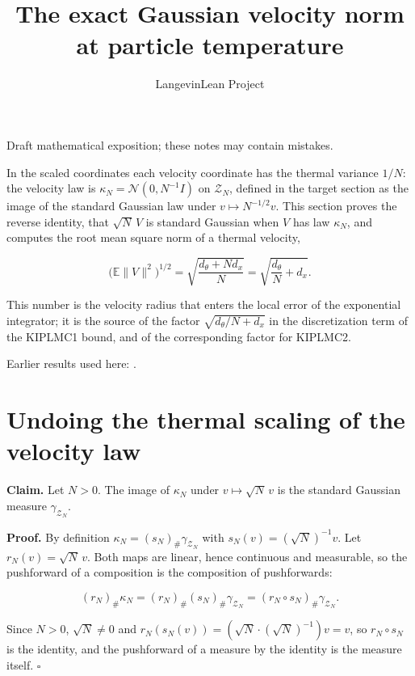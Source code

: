 \documentclass[11pt,a4paper]{article}
\title{\texorpdfstring{The exact Gaussian velocity norm at particle temperature}{The exact Gaussian velocity norm at particle temperature}}
\author{LangevinLean Project}
\date{}
\begin{document}
\maketitle
Draft mathematical exposition; these notes may contain mistakes.


In the scaled coordinates each velocity coordinate has the thermal variance \(1/N\): the velocity law is \(\kappa_N=\mathcal N(0,N^{-1}I)\) on \(\mathcal Z_N\), defined in the target section as the image of the standard Gaussian law under \(v\mapsto N^{-1/2}v\). This section proves the reverse identity, that \(\sqrt N\,V\) is standard Gaussian when \(V\) has law \(\kappa_N\), and computes the root mean square norm of a thermal velocity,


\[\bigl(\mathbb E\|V\|^2\bigr)^{1/2}=\sqrt{\frac{d_\theta+Nd_x}N}=\sqrt{\frac{d_\theta}N+d_x}.\]


This number is the velocity radius that enters the local error of the exponential integrator; it is the source of the factor \(\sqrt{d_\theta/N+d_x}\) in the discretization term of the KIPLMC1 bound, and of the corresponding factor for KIPLMC2.



Earlier results used here: \cite[Section~3.40]{LangevinLean2026Kinetic}.

\section{\texorpdfstring{Undoing the thermal scaling of the velocity law}{Undoing the thermal scaling of the velocity law}}


\textbf{Claim.} Let \(N>0\). The image of \(\kappa_N\) under \(v\mapsto\sqrt N\,v\) is the standard Gaussian measure \(\gamma_{\mathcal Z_N}\).




\textbf{Proof.} By definition \(\kappa_N=(s_N)_\#\gamma_{\mathcal Z_N}\) with \(s_N(v)=(\sqrt N)^{-1}v\). Let \(r_N(v)=\sqrt N\,v\). Both maps are linear, hence continuous and measurable, so the pushforward of a composition is the composition of pushforwards:


\[(r_N)_\#\kappa_N=(r_N)_\#(s_N)_\#\gamma_{\mathcal Z_N}=(r_N\circ s_N)_\#\gamma_{\mathcal Z_N}.\]


Since \(N>0\), \(\sqrt N\ne0\) and \(r_N(s_N(v))=(\sqrt N\cdot(\sqrt N)^{-1})v=v\), so \(r_N\circ s_N\) is the identity, and the pushforward of a measure by the identity is the measure itself. \(\square\)
\end{document}
